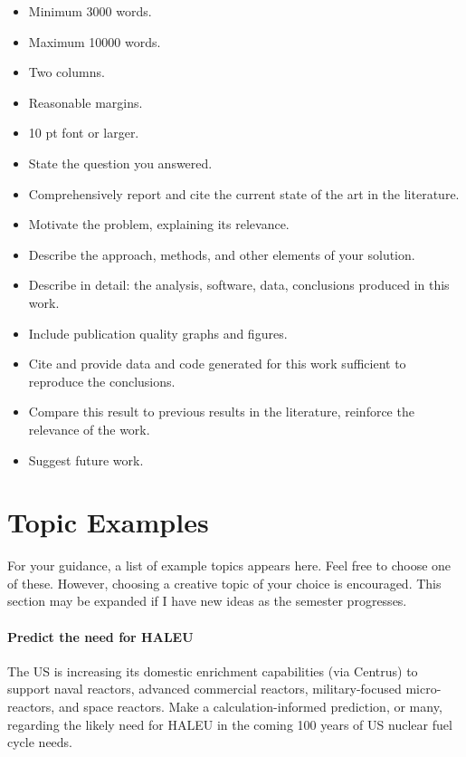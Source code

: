 \documentclass[12pts, answers]{exam}
\begin{document}
\begin{questions}
\begin{itemize}
\item Minimum 3000 words.
\item Maximum 10000 words.
\item Two columns.
\item Reasonable margins.
\item 10 pt font or larger.
\item State the question you answered.
\item Comprehensively report and cite the current state of the art in the literature.
\item Motivate the problem, explaining its relevance.
\item Describe the approach, methods, and other elements of your solution.
\item Describe in detail: the analysis, software, data, conclusions produced in this work.
\item Include publication quality graphs and figures.
\item Cite and provide data and code generated for this work sufficient to reproduce the conclusions.
\item Compare this result to previous results in the literature, reinforce the relevance of the work.
\item Suggest future work.
\end{itemize}

\end{questions}


\section*{Topic Examples}
For your guidance, a list of example topics appears here.
Feel free to choose one of these.  However, choosing a creative topic
of your choice is encouraged. This section may be expanded if I have new ideas
as the semester progresses.

\paragraph{Predict the need for HALEU}
The US is increasing its domestic enrichment capabilities (via Centrus) to 
support naval reactors, advanced commercial reactors, military-focused 
micro-reactors, and space reactors. Make a calculation-informed prediction, or 
many, regarding the likely need for HALEU in the coming 100 years of US nuclear 
fuel cycle needs.
\end{document}
